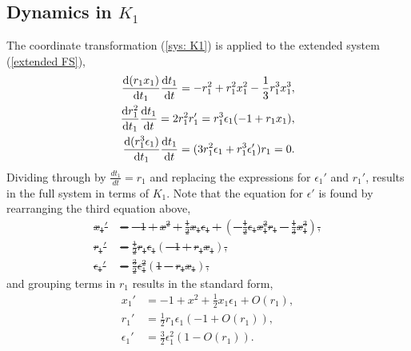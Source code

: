 \subsection{Dynamics in \texorpdfstring{$K_1$}{K1}}\label{sec:dynamics-in-texorpdfstringk1k1} 
The coordinate transformation (\ref{sys: K1}) is applied to the extended system (\ref{extended FS}), 
\begin{align*}
\frac{\dif (r_1x_1)}{\dif t_1} \frac{\dif t_1}{\dif t} = -r_1^2 + r_1^2x_1^2 - \frac{1}{3}r_1^3x_1^3,\\
\frac{\dif r_1^2}{\dif t_1}\frac{\dif t_1}{\dif t}= 2r_1^2r_1' = r_1^3 \epsilon_1 (-1 +r_1 x_1),\\
\frac{\dif (r_1^3 \epsilon_1)}{\dif t_1}\frac{\dif t_1}{\dif t}= (3r_1^2\epsilon_1 + r_1^3 \epsilon_1') r_1 = 0.
\end{align*}
Dividing through by $\frac{dt_1}{dt}=r_1$ and replacing the expressions for $\epsilon_1'$ and $r_1'$, results in the full system in terms of $K_1$. Note that the equation for $\epsilon'$ is found by rearranging the third equation above, \st
\begin{align*}
x_1' &= -1 +x^2 + \frac{1}{2} x_1 \epsilon_1 + \left( - \frac{1}{2} \epsilon_1 x_1^2r_1 - \frac{1}{3} x_1^3 \right),\\
r_1' &= \frac{1}{2} r_1 \epsilon_1( -1 + r_1 x_1),\\
\epsilon_1' &= \frac{3}{2} \epsilon_1^2 ( 1- r_1x_1),
\end{align*}
and grouping terms in $r_1$ results in the standard form,
\begin{equation}
\begin{aligned} \label{K1systemfull}
x_1' &= -1 +x^2 + \frac{1}{2} x_1 \epsilon_1 +O(r_1),\\
r_1' &= \frac{1}{2} r_1 \epsilon_1( -1 + O(r_1)),\\
\epsilon_1' &= \frac{3}{2} \epsilon_1^2 ( 1- O(r_1)).
\end{aligned}
\end{equation}

